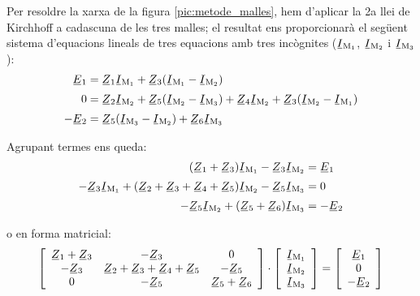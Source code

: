 Per resoldre la xarxa de la figura \vref{pic:metode_malles}, hem d'aplicar la 2a llei de Kirchhoff  a cadascuna de les tres malles; el resultat ens proporcionarà el següent sistema d'equacions lineals de tres equacions amb tres incògnites ($\cmplx{I}\ped{M_1}$, $\cmplx{I}\ped{M_2}$ i $\cmplx{I}\ped{M_3}$):
\begin{subequations}
\begin{align}
    \cmplx{E}_1 &= \cmplx{Z}_1 \cmplx{I}\ped{M_1} + \cmplx{Z}_3 (\cmplx{I}\ped{M_1}-\cmplx{I}\ped{M_2}) \\[0.5ex]
    0 &= \cmplx{Z}_2 \cmplx{I}\ped{M_2} + \cmplx{Z}_5(\cmplx{I}\ped{M_2}-\cmplx{I}\ped{M_3}) + \cmplx{Z}_4 \cmplx{I}\ped{M_2} + \cmplx{Z}_3(\cmplx{I}\ped{M_2}-\cmplx{I}\ped{M_1}) \\[0.5ex]
    -\cmplx{E}_2 &=  \cmplx{Z}_5 (\cmplx{I}\ped{M_3}-\cmplx{I}\ped{M_2})+\cmplx{Z}_6 \cmplx{I}\ped{M_3}
\end{align}
\end{subequations}

Agrupant termes ens queda:
\begin{subequations}
\begin{align}
    (\cmplx{Z}_1 + \cmplx{Z}_3) \cmplx{I}\ped{M_1} - \cmplx{Z}_3 \cmplx{I}\ped{M_2} &= \cmplx{E}_1 \\[0.5ex]
    -\cmplx{Z}_3 \cmplx{I}\ped{M_1} + (\cmplx{Z}_2 + \cmplx{Z}_3+ \cmplx{Z}_4+ \cmplx{Z}_5)\cmplx{I}\ped{M_2} - \cmplx{Z}_5 \cmplx{I}\ped{M_3} &= 0 \\[0.5ex]
     -\cmplx{Z}_5 \cmplx{I}\ped{M_2} +  (\cmplx{Z}_5 + \cmplx{Z}_6) \cmplx{I}\ped{M_3} &= -\cmplx{E}_2
\end{align}
\end{subequations}

o en forma matricial:
\begin{equation}\label{eq:malles-mat}
  \begin{bmatrix}\begin{array}{ccc} 
      \cmplx{Z}_1 + \cmplx{Z}_3 & -\cmplx{Z}_3 & 0 \\
      -\cmplx{Z}_3 & \cmplx{Z}_2 + \cmplx{Z}_3+ \cmplx{Z}_4+ \cmplx{Z}_5 & -\cmplx{Z}_5 \\
      0 & -\cmplx{Z}_5 & \cmplx{Z}_5 + \cmplx{Z}_6 
  \end{array}\end{bmatrix}
  \cdot
  \begin{bmatrix}\begin{array}{c} 
        \cmplx{I}\ped{M_1} \\
        \cmplx{I}\ped{M_2} \\
        \cmplx{I}\ped{M_3} 
  \end{array}\end{bmatrix}
  =
  \begin{bmatrix}\begin{array}{c} 
        \cmplx{E}_1 \\
        0 \\
        -\cmplx{E}_2 
   \end{array}\end{bmatrix}
\end{equation}

